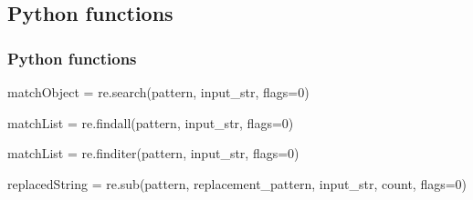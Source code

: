 \documentclass[xcolor=x11names,compress]{beamer}
\renewcommand{\(}{\begin{columns}}
\renewcommand{\)}{\end{columns}}
\newcommand{\<}[1]{\begin{column}{#1}}
\renewcommand{\>}{\end{column}}
\begin{document}
\subsection{Python functions}
\begin{frame}[fragile]
\frametitle{Python functions}
\begin{tcolorbox}
matchObject = re.search(pattern, input\_str, flags=0)	
\end{tcolorbox}
\begin{tcolorbox}
matchList = re.findall(pattern, input\_str, flags=0)	
\end{tcolorbox}
\begin{tcolorbox}
matchList = re.finditer(pattern, input\_str, flags=0)	
\end{tcolorbox}
\begin{tcolorbox}
replacedString = re.sub(pattern, replacement\_pattern, input\_str, count, flags=0)
\end{tcolorbox}
\end{frame}
\end{document}
